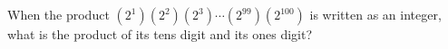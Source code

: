 When the product $\left(2^1\right)\left(2^2\right)\left(2^3\right)\cdots\left(2^{99}\right)\left(2^{100}\right)$ is written as an integer, what is the product of its tens digit and its ones digit?
